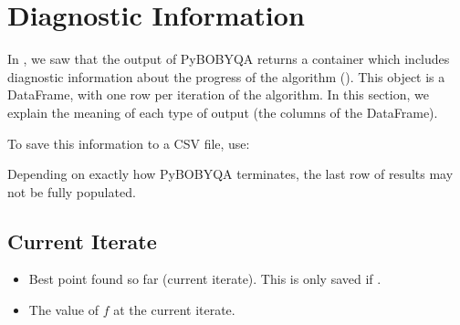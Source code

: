 \documentclass[letterpaper,10pt,english]{sphinxmanual}
\begin{document}
\chapter{Diagnostic Information}
\label{\detokenize{diagnostic:diagnostic-information}}\label{\detokenize{diagnostic::doc}}
In {\hyperref[\detokenize{userguide::doc}]{}}, we saw that the output of Py\sphinxhyphen{}BOBYQA returns a container which includes diagnostic information about the progress of the algorithm (). This object is a  DataFrame, with one row per iteration of the algorithm. In this section, we explain the meaning of each type of output (the columns of the DataFrame).

To save this information to a CSV file, use:
\begin{quote}

\begin{sphinxVerbatim}[commandchars=\\\{\}]

   

    

\end{sphinxVerbatim}
\end{quote}

Depending on exactly how Py\sphinxhyphen{}BOBYQA terminates, the last row of results may not be fully populated.


\section{Current Iterate}
\label{\detokenize{diagnostic:current-iterate}}\begin{itemize}
\item {} 
 \sphinxhyphen{} Best point found so far (current iterate). This is only saved if .

\item {} 
 \sphinxhyphen{} The value of \(f\) at the current iterate.

\end{itemize}
\end{document}
